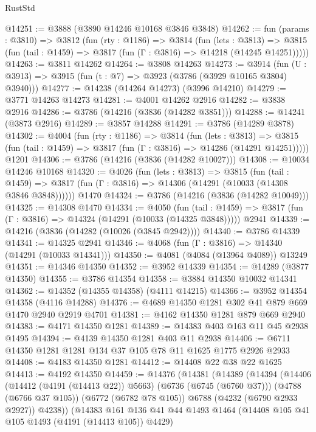 \begin{lexlean}{RustStd}
\begin{coremodule}
@14251 := @3888 (@3890 @14246 @10168 @3846 @3848)
@14262 := fun (params : @3810) =>
  @3812
    (fun (rty : @1186) =>
    @3814
      (fun (lets : @3813) =>
      @3815 (fun (tail : @1459) => @3817 (fun (Γ : @3816) => @14218 (@14245 @14251)))))
@14263 := @3811 @14262
@14264 := @3808 @14263
@14273 := @3914
    (fun (U : @3913) => @3915 (fun (t : @7) => @3923 (@3786 (@3929 @10165 @3804) @3940)))
@14277 := @14238 (@14264 @14273) (@3996 @14210)
@14279 := @3771 @14263 @14273
@14281 := @4001 @14262 @2916
@14282 := @3838 @2916
@14286 := @3786 (@14216 (@3836 (@14282 @3851)))
@14288 := @14241 (@3873 @2916)
@14289 := @3857 @14288
@14291 := @3786 (@14289 @3878)
@14302 := @4004
    (fun (rty : @1186) =>
    @3814
      (fun (lets : @3813) =>
      @3815 (fun (tail : @1459) => @3817 (fun (Γ : @3816) => @14286 (@14291 @14251)))))
    @1201
@14306 := @3786 (@14216 (@3836 (@14282 @10027)))
@14308 := @10034 @14246 @10168
@14320 := @4026
    (fun (lets : @3813) =>
    @3815
      (fun (tail : @1459) =>
      @3817 (fun (Γ : @3816) => @14306 (@14291 (@10033 (@14308 @3846 @3848))))))
    @1470
@14324 := @3786 (@14216 (@3836 (@14282 @10049)))
@14325 := @14308 @1470
@14334 := @4050
    (fun (tail : @1459) => @3817 (fun (Γ : @3816) => @14324 (@14291 (@10033 (@14325 @3848)))))
    @2941
@14339 := @14216 (@3836 (@14282 (@10026 (@3845 @2942))))
@14340 := @3786 @14339
@14341 := @14325 @2941
@14346 := @4068 (fun (Γ : @3816) => @14340 (@14291 (@10033 @14341)))
@14350 := @4081 (@4084 (@13964 @4089)) @13249
@14351 := @14346 @14350
@14352 := @3952 @14339
@14354 := @14289 (@3877 @14350)
@14355 := @3786 @14354
@14358 := @3884 @14350 @10032 @14341
@14362 := @14352 (@14355 @14358) (@4111 @14215)
@14366 := @3952 @14354 @14358 (@4116 @14288)
@14376 := @4689 @14350 @1281 @302 @41 @879 @669 @1470 @2940 @2919 @4701
@14381 := @4162 @14350 @1281 @879 @669 @2940
@14383 := @4171 @14350 @1281
@14389 := @14383 @403 @163 @11 @45 @2938 @1495
@14394 := @4139 @14350 @1281 @403 @11 @2938
@14406 := @6711 @14350 @1281 @1281 @134 @37 @105 @78 @11 @1625 @1775 @2926 @2933
@14408 := @4183 @14350 @1281
@14412 := @14408 @22 @38 @22 @1625
@14413 := @4192 @14350
@14459 := @14376
    (@14381
      (@14389
        (@14394
          (@14406
            (@14412 (@4191 (@14413 @22)) @5663)
            (@6736 (@6745 (@6760 @37)))
            (@4788 (@6766 @37 @105))
            (@6772 (@6782 @78 @105))
            @6788
            (@4232 (@6790 @2933 @2927))
            @4238))
        (@14383
          @161
          @136
          @41
          @44
          @1493
          @1464
          (@14408 @105 @41 @105 @1493 (@4191 (@14413 @105)) @4429)

\end{coremodule}
\end{lexlean}
